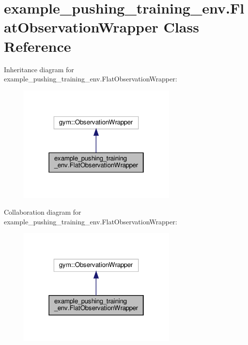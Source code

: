 \hypertarget{classexample__pushing__training__env_1_1FlatObservationWrapper}{}\section{example\+\_\+pushing\+\_\+training\+\_\+env.\+Flat\+Observation\+Wrapper Class Reference}
\label{classexample__pushing__training__env_1_1FlatObservationWrapper}


Inheritance diagram for example\+\_\+pushing\+\_\+training\+\_\+env.\+Flat\+Observation\+Wrapper\+:
\nopagebreak
\begin{figure}[H]
\begin{center}
\leavevmode
\includegraphics[width=226pt]{classexample__pushing__training__env_1_1FlatObservationWrapper__inherit__graph}
\end{center}
\end{figure}


Collaboration diagram for example\+\_\+pushing\+\_\+training\+\_\+env.\+Flat\+Observation\+Wrapper\+:
\nopagebreak
\begin{figure}[H]
\begin{center}
\leavevmode
\includegraphics[width=226pt]{classexample__pushing__training__env_1_1FlatObservationWrapper__coll__graph}
\end{center}
\end{figure}
